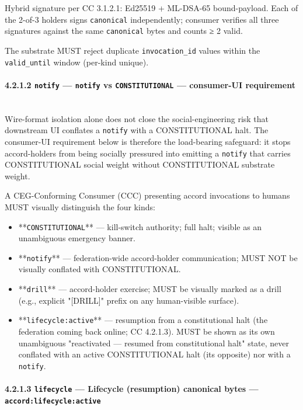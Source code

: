 \documentclass[11pt]{article}
\begin{document}
Hybrid signature per CC 3.1.2.1: Ed25519 + ML-DSA-65 bound-payload. Each of the 2-of-3 holders signs \texttt{canonical} independently; consumer verifies all three signatures against the same \texttt{canonical} bytes and counts ≥ 2 valid.


The substrate MUST reject duplicate \texttt{invocation\_id} values within the \texttt{valid\_until} window (per-kind unique).


\paragraph{4.2.1.2 \texttt{notify} — \texttt{notify} vs \texttt{CONSTITUTIONAL} — consumer-UI requirement}\mbox{}\\


Wire-format isolation alone does not close the social-engineering risk that downstream UI conflates a \texttt{notify} with a CONSTITUTIONAL halt. The consumer-UI requirement below is therefore the load-bearing safeguard: it stops accord-holders from being socially pressured into emitting a \texttt{notify} that carries CONSTITUTIONAL social weight without CONSTITUTIONAL substrate weight.


A CEG-Conforming Consumer (CCC) presenting accord invocations to humans MUST visually distinguish the four kinds:


\begin{itemize}\setlength\itemsep{0pt}
\item **\texttt{CONSTITUTIONAL}** — kill-switch authority; full halt; visible as an unambiguous emergency banner.
\item **\texttt{notify}** — federation-wide accord-holder communication; MUST NOT be visually conflated with CONSTITUTIONAL.
\item **\texttt{drill}** — accord-holder exercise; MUST be visually marked as a drill (e.g., explicit "[DRILL]" prefix on any human-visible surface).
\item **\texttt{lifecycle:active}** — resumption from a constitutional halt (the federation coming back online; CC 4.2.1.3). MUST be shown as its own unambiguous "reactivated — resumed from constitutional halt" state, never conflated with an active CONSTITUTIONAL halt (its opposite) nor with a \texttt{notify}.
\end{itemize}


\paragraph{4.2.1.3 \texttt{lifecycle} — Lifecycle (resumption) canonical bytes — \texttt{accord:lifecycle:active}}\mbox{}\\
\end{document}
